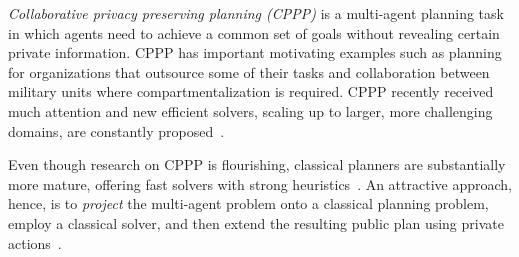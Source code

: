 \documentclass[letterpaper]{article}
\theoremstyle{definition}
\begin{document}
{\em Collaborative privacy preserving planning (CPPP)} is a multi-agent planning task in which agents need to achieve a common set of goals without revealing certain private information. CPPP has important motivating examples such as planning for organizations that outsource some of their tasks and collaboration between military units where compartmentalization is required. CPPP recently received much attention
and new efficient solvers, scaling up to larger, more challenging domains, are constantly proposed~\cite[inter alia]{maliah2015privacy,nissim2014distributed,luis2014planMerging,tovzivcka2014generating,jakubuv2015multiagent}.







Even though research on CPPP is flourishing, classical planners are substantially more mature, offering fast solvers with strong heuristics~\cite{hoffmann2001ff,helmert2009landmarks}. An attractive approach, hence, is to {\em project} the multi-agent problem onto a classical planning problem,  employ a classical solver, and then extend the resulting public plan using private actions~\cite{brafman2008one}.
\end{document}
